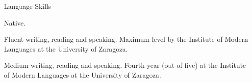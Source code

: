 \documentclass[12pt,2up]{article}
\begin{document}
\begin{cv}{}
\begin{cvlist}{Language Skills}
\item[\underline{Spanish}] Native.
\item[\underline{English}] Fluent writing, reading and speaking. Maximum level
    by the Institute of Modern Languages at the University of Zaragoza.
\item[\underline{French}] Medium writing, reading and speaking. Fourth year
    (out of five) at the Institute of Modern Languages at the University of
    Zaragoza.
  \end{cvlist}

\end{cv}
\end{document}
